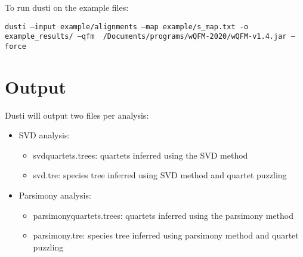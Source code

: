 \documentclass{scrartcl}
\begin{document}
To run dusti on the example files:


\texttt{dusti --input example/alignments --map example/s\_map.txt -o example\_results/ --qfm ~/Documents/programs/wQFM-2020/wQFM-v1.4.jar --force}


\section{Output}

Dusti will output two files per analysis:

\begin{itemize}
    \item SVD analysis: 
    \begin{itemize}
        \item svdquartets.trees: quartets inferred using the SVD method
        \item svd.tre: species tree inferred using SVD method and quartet puzzling
    \end{itemize}
    \item Parsimony analysis:
    \begin{itemize}
        \item parsimonyquartets.trees: quartets inferred using the parsimony method
        \item parsimony.tre: species tree inferred using parsimony method and quartet puzzling
    \end{itemize}\end{itemize}
\end{document}
